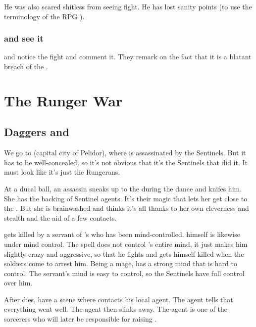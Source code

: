 He was also scared shitless from seeing \Ishnaruchaefir{} fight. He has lost sanity points (to use the terminology of the RPG \cite{RPG:CallofCthulhu}). 





\subsubsection{\Psyrex{} and \Secherdamon{} see it}
\Psyrex{} and \Secherdamon{} notice the fight and comment it. 
They remark on the fact that it is a blatant breach of the \charade. 















\section{The Runger War}
\subsection{Daggers and \Daemons}
We go to \Malcur (capital city of Pelidor), where \rayuth[\Icor] is assassinated by the Sentinels. 
But it has to be well-concealed, so it's not obvious that it's the Sentinels that did it. 
It must look like it's just the Rungerans. 

At a ducal ball, an assassin sneaks up to the \rayuth during the dance and knifes him. She has the backing of Sentinel agents. It's their magic that lets her get close to the \rayuth. But she is brainwashed and thinks it's all thanks to her own cleverness and stealth and the aid of a few contacts. 

\Icor gets killed by a servant of \Onatol's who has been mind-controlled. 
\Onatol himself is likewise under mind control. 
The spell does not control \Onatol's entire mind, it just makes him slightly crazy and aggressive, so that he fights and gets himself killed when the soldiers come to arrest him. 
Being a mage, \Onatol has a strong mind that is hard to control. 
The servant's mind is easy to control, so the Sentinels have full control over him. 

After \Onatol dies, have a scene where \LocarPsyrex contacts his local agent. 
The agent tells \Psyrex that everything went well. 
The agent then slinks away.
The agent is one of the sorcerers who will later be responsible for raising \Nithdornazsh.

